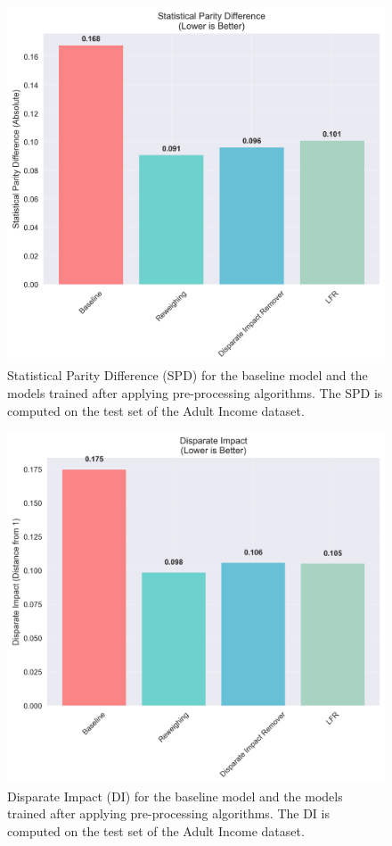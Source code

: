 \documentclass[12pt,a4paper,openright,twoside]{book}
\begin{document}
\begin{figure}
    \centering
    \includegraphics[width=\textwidth]{figures/preprocessing_results/spd_comparison_chart.png}
    \caption{Statistical Parity Difference (SPD) for the baseline model and the models trained after applying pre-processing algorithms. The SPD is computed on the test set of the Adult Income dataset.}
    \label{fig:preprocessing_results}
\end{figure}

\begin{figure}
    \centering
    \includegraphics[width=\textwidth]{figures/preprocessing_results/di_comparison_chart.png}
    \caption{Disparate Impact (DI) for the baseline model and the models trained after applying pre-processing algorithms. The DI is computed on the test set of the Adult Income dataset.}
    \label{fig:preprocessing_results_di}
\end{figure}
\end{document}
